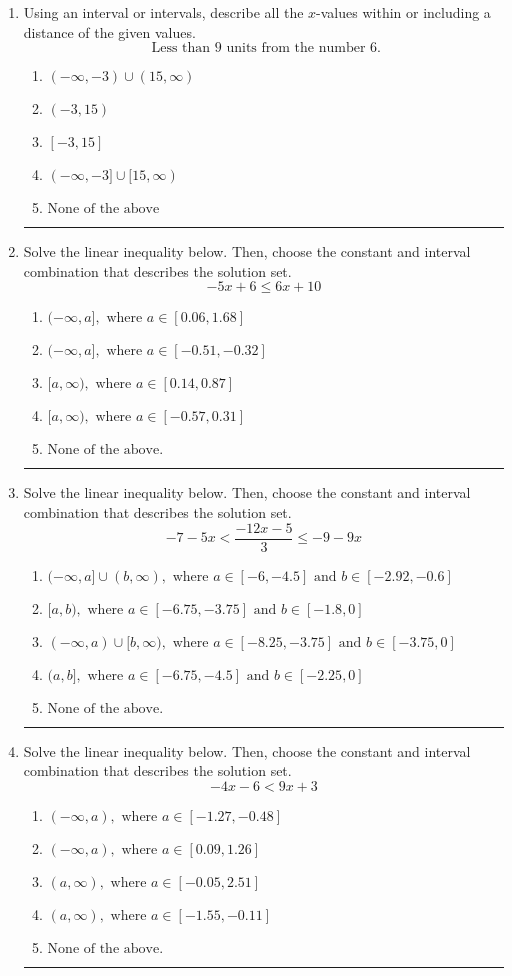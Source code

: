 \documentclass[14pt]{extbook}
\newcommand{\litem}[1]{\item#1\hspace*{-1cm}\rule{\textwidth}{0.4pt}}
\begin{document}
\begin{enumerate}
\litem{
Using an interval or intervals, describe all the $x$-values within or including a distance of the given values.\[ \text{ Less than } 9 \text{ units from the number } 6. \]\begin{enumerate}[label=\Alph*.]
\item \( (-\infty, -3) \cup (15, \infty) \)
\item \( (-3, 15) \)
\item \( [-3, 15] \)
\item \( (-\infty, -3] \cup [15, \infty) \)
\item \( \text{None of the above} \)

\end{enumerate} }
\litem{
Solve the linear inequality below. Then, choose the constant and interval combination that describes the solution set.\[ -5x + 6 \leq 6x + 10 \]\begin{enumerate}[label=\Alph*.]
\item \( (-\infty, a], \text{ where } a \in [0.06, 1.68] \)
\item \( (-\infty, a], \text{ where } a \in [-0.51, -0.32] \)
\item \( [a, \infty), \text{ where } a \in [0.14, 0.87] \)
\item \( [a, \infty), \text{ where } a \in [-0.57, 0.31] \)
\item \( \text{None of the above}. \)

\end{enumerate} }
\litem{
Solve the linear inequality below. Then, choose the constant and interval combination that describes the solution set.\[ -7 - 5 x < \frac{-12 x - 5}{3} \leq -9 - 9 x \]\begin{enumerate}[label=\Alph*.]
\item \( (-\infty, a] \cup (b, \infty), \text{ where } a \in [-6, -4.5] \text{ and } b \in [-2.92, -0.6] \)
\item \( [a, b), \text{ where } a \in [-6.75, -3.75] \text{ and } b \in [-1.8, 0] \)
\item \( (-\infty, a) \cup [b, \infty), \text{ where } a \in [-8.25, -3.75] \text{ and } b \in [-3.75, 0] \)
\item \( (a, b], \text{ where } a \in [-6.75, -4.5] \text{ and } b \in [-2.25, 0] \)
\item \( \text{None of the above.} \)

\end{enumerate} }
\litem{
Solve the linear inequality below. Then, choose the constant and interval combination that describes the solution set.\[ -4x -6 < 9x + 3 \]\begin{enumerate}[label=\Alph*.]
\item \( (-\infty, a), \text{ where } a \in [-1.27, -0.48] \)
\item \( (-\infty, a), \text{ where } a \in [0.09, 1.26] \)
\item \( (a, \infty), \text{ where } a \in [-0.05, 2.51] \)
\item \( (a, \infty), \text{ where } a \in [-1.55, -0.11] \)
\item \( \text{None of the above}. \)


\end{enumerate}}
\end{enumerate}
\end{document}
